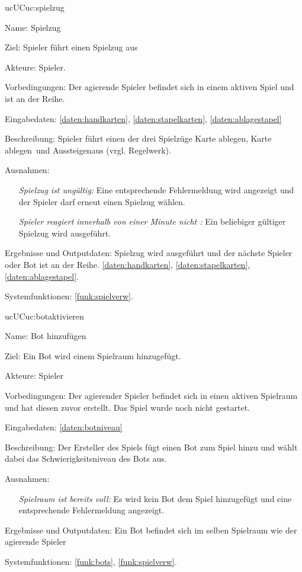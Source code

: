 \begin{description}[leftmargin=5em, style=sameline]
	\begin{lhp}{uc}{UC}{uc:spielzug}
		\item [Name:]Spielzug
		\item [Ziel:]Spieler führt einen Spielzug aus 
		\item [Akteure:]Spieler.
		\item [Vorbedingungen:]Der agierende Spieler befindet sich in einem aktiven Spiel und ist an der Reihe.
		\item [Eingabedaten:] \ref{daten:handkarten}, \ref{daten:stapelkarten}, \ref{daten:ablagestapel} 
		\item [Beschreibung:] Spieler führt einen der drei Spielzüge \dq Karte ablegen\dq, \dq Karte ablegen\dq\ und \dq Aussteigen\dq aus (vrgl. Regelwerk).
		\item [Ausnahmen:] \hfill
		\begin{itemize}
		    \item [] \textit{Spielzug ist ungültig:} Eine entsprechende Fehlermeldung wird angezeigt und der Spieler darf erneut einen Spielzug wählen.
		    
		    \item [] \textit{Spieler reagiert innerhalb von einer Minute nicht :} Ein beliebiger gültiger Spielzug wird ausgeführt.
		\end{itemize}
		\item [Ergebnisse und Outputdaten:] Spielzug wird ausgeführt und der nächste Spieler oder Bot ist an der Reihe. \ref{daten:handkarten}, \ref{daten:stapelkarten}, \ref{daten:ablagestapel}.
		\item [Systemfunktionen:]\ref{funk:spielverw}.
	\end{lhp}
	
	\begin{lhp}{uc}{UC}{uc:botaktivieren}
		\item [Name:]Bot hinzufügen
		\item [Ziel:]Ein Bot wird einem Spielraum hinzugefügt.
		\item [Akteure:] Spieler
		\item [Vorbedingungen:]Der agierender Spieler befindet sich in einen aktiven Spielraum und hat diesen zuvor erstellt. Das Spiel wurde noch nicht gestartet.
		\item [Eingabedaten:] \ref{daten:botniveau}  
		\item [Beschreibung:]Der Ersteller des Spiels fügt einen Bot zum Spiel hinzu und wählt dabei das Schwierigkeitsniveau des Bots aus. 
		\item [Ausnahmen:]\hfill \begin{itemize} 
		    \item []
		    \textit{Spielraum ist bereits voll:} Es wird kein Bot dem Spiel hinzugefügt und eine entsprechende Fehlermeldung angezeigt.
		\end{itemize}
		\item [Ergebnisse und Outputdaten:]Ein Bot befindet sich im selben Spielraum wie der agierende Spieler
		\item [Systemfunktionen:] 
		\ref{funk:bots}, \ref{funk:spielverw}.
	\end{lhp}
	

\end{description}
